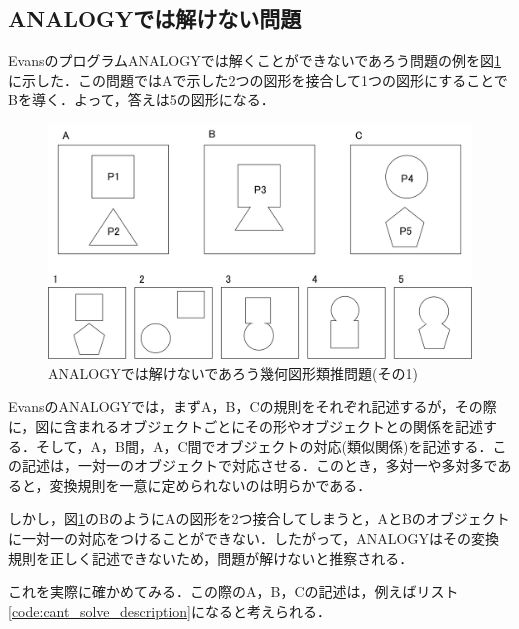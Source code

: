 \documentclass{jarticle}
\begin{document}
\subsection{ANALOGYでは解けない問題}
\label{sec:cant_solve}
EvansのプログラムANALOGYでは解くことができないであろう問題の例を図\ref{fig:cant_solve}に示した．この問題ではAで示した2つの図形を接合して1つの図形にすることでBを導く．よって，答えは5の図形になる．

\begin{figure}[H]
	\begin{center}
	\includegraphics[width=13cm]{image/cant_solve.png}
	\caption{ANALOGYでは解けないであろう幾何図形類推問題(その1)}
	\label{fig:cant_solve}
	\end{center}
\end{figure}

EvansのANALOGYでは，まずA，B，Cの規則をそれぞれ記述するが，その際に，図に含まれるオブジェクトごとにその形やオブジェクトとの関係を記述する．そして，A，B間，A，C間でオブジェクトの対応(類似関係)を記述する．この記述は，一対一のオブジェクトで対応させる．このとき，多対一や多対多であると，変換規則を一意に定められないのは明らかである．

しかし，図\ref{fig:cant_solve}のBのようにAの図形を2つ接合してしまうと，AとBのオブジェクトに一対一の対応をつけることができない．したがって，ANALOGYはその変換規則を正しく記述できないため，問題が解けないと推察される．

これを実際に確かめてみる．この際のA，B，Cの記述は，例えばリスト\ref{code:cant_solve_description}になると考えられる．
\lstset{style=customplain}

\end{document}
